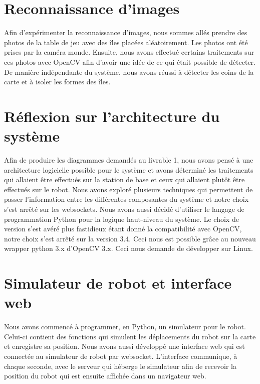 \section{Reconnaissance d'images}
Afin d'expérimenter la reconnaissance d'images, nous sommes allés prendre des photos de la table de jeu avec des îles placées aléatoirement. Les photos ont
été prises par la caméra monde. Ensuite, nous avons effectué certains traitements sur ces photos avec OpenCV afin d'avoir une idée de ce qui était possible de détecter.
De manière indépendante du système, nous avons réussi à détecter les coins de la carte et à isoler les formes des îles.

\section{Réflexion sur l'architecture du système}
Afin de produire les diagrammes demandés au livrable 1, nous avons pensé à une architecture logicielle possible pour le système et avons déterminé les traitements qui allaient être effectués sur la station de base
et ceux qui allaient plutôt être effectués sur le robot. Nous avons exploré plusieurs techniques qui permettent de passer l'information entre les différentes composantes du système et notre
choix s'est arrêté sur les websockets. Nous avons aussi décidé d'utiliser le langage de programmation Python pour la logique haut-niveau du système. Le choix de version s'est avéré plus fastidieux étant donné la
compatibilité avec OpenCV, notre choix s'est arrêté sur la version 3.4. Ceci nous est possible grâce au nouveau wrapper python 3.x d'OpenCV 3.x. Ceci nous demande de développer sur Linux.

\section{Simulateur de robot et interface web}
Nous avons commencé à programmer, en Python, un simulateur pour le robot. Celui-ci contient des fonctions qui simulent les déplacements du robot sur la carte et enregistre sa position.
Nous avons aussi développé une interface web qui est connectée au simulateur de robot par websocket. L'interface communique, à chaque seconde, avec le serveur qui héberge
le simulateur afin de recevoir la position du robot qui est ensuite affichée dans un navigateur web.


